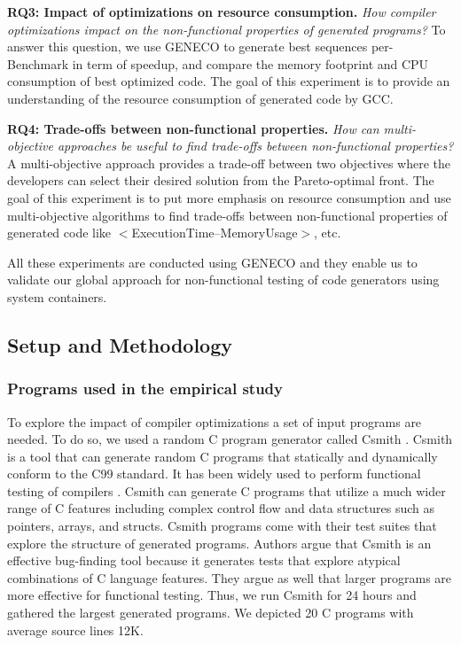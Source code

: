 \textbf{RQ3: Impact of optimizations on resource consumption.} 
\textit{How compiler optimizations impact on the non-functional properties of generated programs?}
To answer this question, we use GENECO to generate best sequences per-Benchmark in term of speedup, and compare the memory footprint and CPU consumption of best optimized code. The goal of this experiment is to provide an understanding of the resource consumption of generated code by GCC. 

\textbf{RQ4: Trade-offs between non-functional properties.} 
\textit{How can multi-objective approaches be useful to find trade-offs between non-functional properties?}
A multi-objective approach provides a trade-off between two objectives where the developers can select their desired solution from the Pareto-optimal front. The goal of this experiment is to put more emphasis on resource consumption and use multi-objective algorithms to find trade-offs between non-functional properties of generated code like $<$ExecutionTime--MemoryUsage$>$, etc.

All these experiments are conducted using GENECO and they enable us to validate our global approach for non-functional testing of code generators using system containers. 

\subsection{Setup and Methodology}
\subsubsection{Programs used in the empirical study}
To explore the impact of compiler optimizations a set of input programs are needed. 
To do so, we used a random C program generator called Csmith \cite{yang2011finding}.
Csmith is a tool that can generate random C programs that statically and dynamically conform to the C99 standard. It has been widely used to perform functional testing of compilers \cite{le2014compiler} \cite{nagai2013scaling}. Csmith can generate C programs that utilize a much wider range of C features including complex control flow and data structures such as pointers, arrays, and structs. Csmith programs come with their test suites that explore the structure of generated programs. 
Authors argue that Csmith is an effective bug-finding tool because it generates tests that explore atypical combinations of C language features. They argue as well that larger programs are more effective for functional testing. Thus, we run Csmith for 24 hours and gathered the largest generated programs. We depicted 20 C programs with average source lines 12K.

